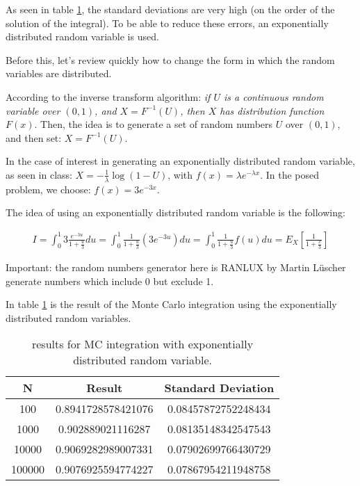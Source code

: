 \documentclass[paper=a4, fontsize=11pt]{scrartcl} %
\numberwithin{equation}{section} %
\numberwithin{figure}{section} %
\numberwithin{table}{section} %
\begin{document}
\begin{itemize}
As seen in table \ref{tab:MC_integration_exponential}, the standard deviations are very high (on the order of the solution of the integral). To be able to reduce these errors, an exponentially distributed random variable is used.

Before this, let's review quickly how to change the form in which the random variables are distributed.

According to the inverse transform algorithm: \textit{if $U$ is a continuous random variable over $(0,1)$, and $X = F^{-1}(U)$, then $X$ has distribution function $F(x)$}. Then, the idea is to generate a set of random numbers $U$ over $(0,1)$, and then set: $X = F^{-1}(U)$.

In the case of interest in generating an exponentially distributed random variable, as seen in class: $X = -\frac{1}{\lambda}\log(1-U)$, with $f(x) = \lambda e^{-\lambda x}$. In the posed problem, we choose: $f(x) = 3 e^{-3 x}$.

The idea of using an exponentially distributed random variable is the following:


\begin{equation}
\begin{split}
I = \int_{0}^{1}3\frac{e^{-3u}}{1+\frac{u}{3}}du = \int_{0}^{1}\frac{1}{1+\frac{u}{3}}(3e^{-3u})du = \int_{0}^{1}\frac{1}{1+\frac{u}{3}}f(u)du = E_{X}\left[ \frac{1}{1+\frac{x}{3}} \right]
\end{split}
\label{eq:exponential_integration2}
\end{equation}


Important: the random numbers generator here is RANLUX by Martin L{\"u}scher generate numbers which include 0 but exclude 1.

In table \ref{tab:MC_integration_exponential} is the result of the Monte Carlo integration using the exponentially distributed random variables.




\begin{table}
\label{tab:MC_integration_exponential}
\caption{results for MC integration with exponentially distributed random variable.}
\begin{center}
\begin{tabular}{ | c | c | c | }
\hline
 \textbf{N} & \textbf{Result} & \textbf{Standard Deviation} \\ \hline
 100 & 0.8941728578421076 & 0.08457872752248434 \\ \hline
 1000 & 0.902889021116287 & 0.08135148342547543 \\  \hline
 10000 & 0.9069282989007331 & 0.07902699766430729 \\ \hline
 100000 & 0.9076925594774227 & 0.07867954211948758 \\ \hline
\end{tabular}
\end{center}
\end{table}




\end{itemize}
\end{document}
